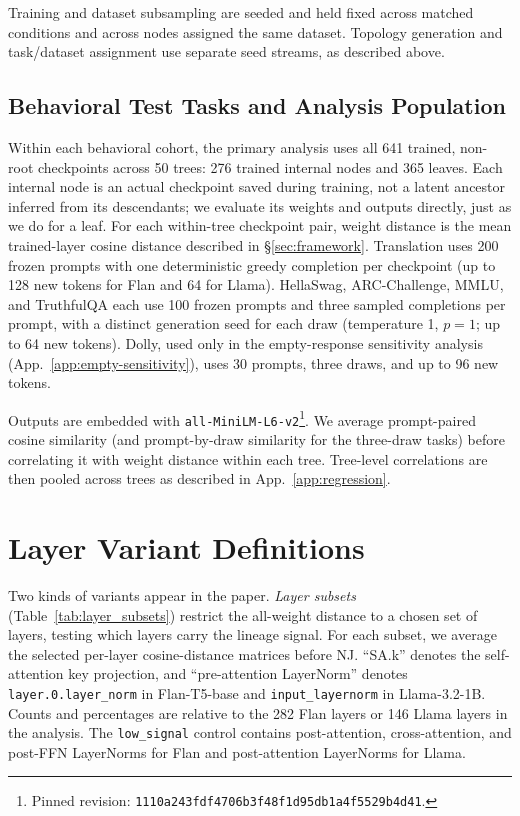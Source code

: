 \documentclass{article}
\theoremstyle{definition}
\theoremstyle{plain}
\begin{document}
Training and dataset subsampling are seeded and held fixed across matched conditions and across
nodes assigned the same dataset. Topology generation and task/dataset assignment use separate seed
streams, as described above.

\subsection*{Behavioral Test Tasks and Analysis Population}
Within each behavioral cohort, the primary analysis uses all 641 trained, non-root checkpoints
across 50 trees: 276 trained internal nodes and 365 leaves. Each internal node is an actual
checkpoint saved during training, not a latent ancestor inferred from its descendants; we evaluate
its weights and outputs directly, just as we do for a leaf. For each within-tree checkpoint pair, weight distance is the mean
trained-layer cosine distance described in \S\ref{sec:framework}. Translation uses 200 frozen prompts with one
deterministic greedy completion per checkpoint (up to 128 new tokens for Flan and 64 for Llama).
HellaSwag, ARC-Challenge, MMLU, and TruthfulQA
each use 100 frozen prompts and three sampled completions per prompt, with a distinct generation seed
for each draw (temperature 1, $p=1$; up to 64 new tokens). Dolly, used only in the
empty-response sensitivity analysis (App.~\ref{app:empty-sensitivity}), uses 30 prompts, three draws, and up to 96 new tokens.

Outputs are embedded with \texttt{all-MiniLM-L6-v2}\footnote{Pinned revision:
\nolinkurl{1110a243fdf4706b3f48f1d95db1a4f5529b4d41}.}. We average prompt-paired cosine similarity (and
prompt-by-draw similarity for the three-draw tasks) before correlating it with weight distance within
each tree. Tree-level correlations are then pooled across trees as described in App.~\ref{app:regression}.

\section{Layer Variant Definitions}
\label{app:layers}
Two kinds of variants appear in the paper. \emph{Layer subsets} (Table~\ref{tab:layer_subsets})
restrict the all-weight distance to a chosen set of layers, testing which layers carry the lineage
signal. For each subset, we average the selected per-layer cosine-distance matrices before NJ. ``SA.k'' denotes the self-attention key projection, and ``pre-attention LayerNorm'' denotes
\texttt{layer.0.layer\_norm} in Flan-T5-base and \texttt{input\_layernorm} in Llama-3.2-1B.
Counts and percentages are relative to the 282 Flan layers or 146 Llama layers in the analysis.
The \texttt{low\_signal} control contains post-attention, cross-attention, and post-FFN LayerNorms
for Flan and post-attention LayerNorms for Llama.
\end{document}
